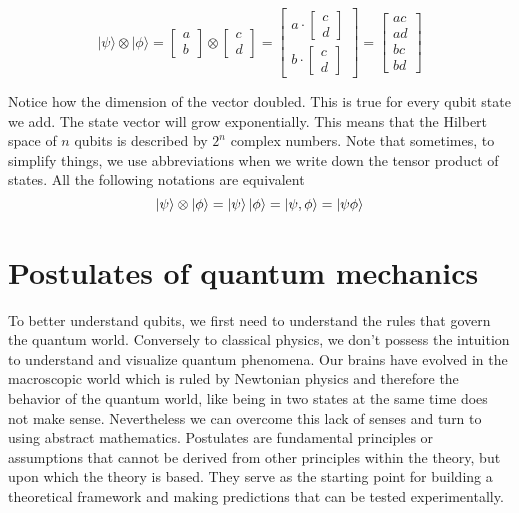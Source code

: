 \documentclass[12pt,a4paper]{report}
\begin{document}
\[ |\psi\rangle \otimes |\phi\rangle = \begin{bmatrix} a \\ b \end{bmatrix} \otimes \begin{bmatrix} c \\ d \end{bmatrix} = \begin{bmatrix} a \cdot \begin{bmatrix} c \\ d \end{bmatrix} \\ b \cdot \begin{bmatrix} c \\ d \end{bmatrix} \end{bmatrix} = \begin{bmatrix} ac \\ ad \\ bc \\ bd \end{bmatrix} \]

\noindent
Notice how the dimension of the vector doubled. This is true for every qubit state we add. The state vector will grow exponentially. This means that the Hilbert space of \(n\) qubits is described by \(2^n\) complex numbers. Note that sometimes, to simplify things, we use abbreviations when we write down the tensor product of states. All the following notations are equivalent
\[\ket{\psi} \otimes \ket{\phi} = \ket{\psi}\ket{\phi} = \ket{\psi,\phi} = \ket{\psi \phi}\]


\section{Postulates of quantum mechanics}

To better understand qubits, we first need to understand the rules that govern the quantum world. Conversely to classical physics, we don't possess the intuition to understand and visualize quantum phenomena. Our brains have evolved in the macroscopic world which is ruled by Newtonian physics and therefore the behavior of the quantum world, like being in two states at the same time does not make sense. Nevertheless we can overcome this lack of senses and turn to using abstract mathematics. Postulates are fundamental principles or assumptions that cannot be derived from other principles within the theory, but upon which the theory is based. They serve as the starting point for building a theoretical framework and making predictions that can be tested experimentally.
\\
\end{document}
